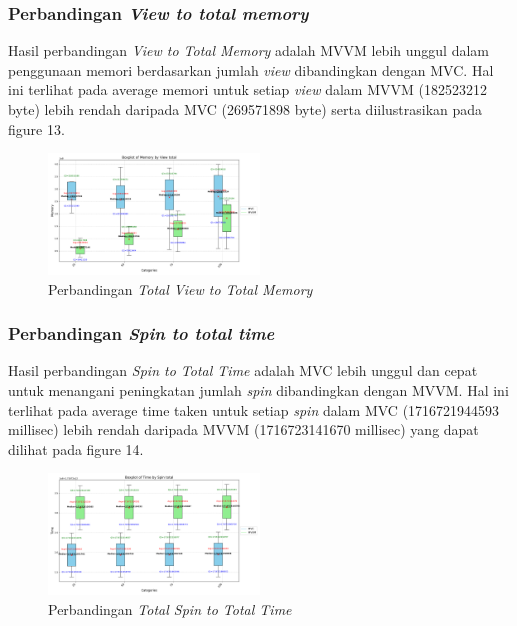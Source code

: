 \documentclass[conference]{IEEEtran}
\begin{document}
	\subsubsection{Perbandingan \textit{View to total memory}}
	Hasil perbandingan \textit{View to Total Memory} adalah MVVM lebih unggul dalam penggunaan memori berdasarkan jumlah \textit{view} dibandingkan dengan MVC. Hal ini terlihat pada average memori untuk setiap \textit{view} dalam MVVM (182523212 byte) lebih rendah daripada MVC (269571898 byte) serta diilustrasikan pada figure 13.
	\begin{figure}[h]
		\centering
		\includegraphics[width=0.5\textwidth]{../mvc-mvvm/plot_view_total_memory.pdf}
		\caption{Perbandingan \textit{Total View to Total Memory}}
		\label{fig:total_view_to_total_memory}
	\end{figure}
	
	\subsubsection{Perbandingan \textit{Spin to total time}}
	Hasil perbandingan \textit{Spin to Total Time} adalah MVC lebih unggul dan cepat untuk menangani peningkatan jumlah \textit{spin} dibandingkan dengan MVVM. Hal ini terlihat pada average time taken untuk setiap \textit{spin} dalam MVC (1716721944593 millisec) lebih rendah daripada MVVM (1716723141670 millisec) yang dapat dilihat pada figure 14.
	
	\begin{figure}[h]
		\centering
		\includegraphics[width=0.5\textwidth]{../mvc-mvvm/plot_spin_total_time.pdf}
		\caption{Perbandingan \textit{Total Spin to Total Time}}
		\label{fig:total_spin_to_total_time}
	\end{figure}
	
\end{document}
